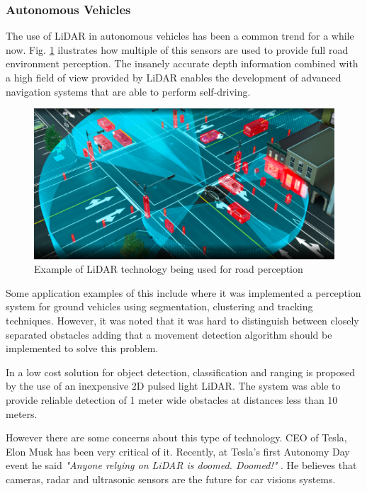 \subsubsection*{Autonomous Vehicles}

The use of \ac{LiDAR} in autonomous vehicles has been a common trend for a while now. Fig. \ref{fig:lidarcar} ilustrates how multiple of this sensors are used to provide full road environment perception. The insanely accurate depth information combined with a high field of view provided by \ac{LiDAR} enables the development of advanced navigation systems that are able to perform self-driving.
 
 
\begin{figure}[h] 
\centerline{\includegraphics [width=0.7 \textwidth]{imgs/chapter2/lidarcar.png}}
\caption{Example of \ac{LiDAR} technology being used for road perception \cite{lidarcar}}
\label{fig:lidarcar}
\end{figure}

Some application examples of this include \cite{lidarperception}  where it was implemented a perception system for ground vehicles using segmentation, clustering and tracking techniques.  However, it was noted that it was hard to distinguish between closely separated obstacles adding that a movement detection algorithm should be implemented to solve this problem. 


In \cite{car2dlidar} a low cost solution for object detection, classification and ranging is  proposed by the use of an inexpensive 2D pulsed light \ac{LiDAR}. The system was able to provide reliable detection of 1 meter wide obstacles at distances less than 10 meters.


However there are some concerns about this type of technology. CEO of Tesla, Elon Musk has been very critical of it. Recently, at Tesla’s first Autonomy Day event  he said \textit{"Anyone relying on \ac{LiDAR} is doomed. Doomed!"} \cite{elon}. He believes that cameras, radar and ultrasonic sensors are the future for car visions systems. 
